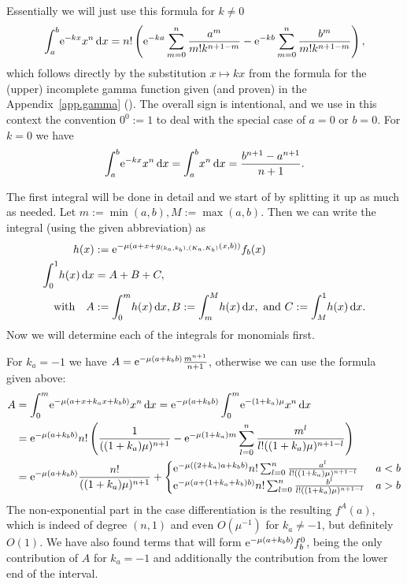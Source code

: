 \begin{Lemma}
  \begin{Proof}
    Essentially we will just use this formula for $k \neq 0$
    \begin{align}
      \Integ[b]{a}{x}{\Eto{-kx}x^n}
        = n!\left(\Eto{-ka}\sum_{m=0}^n \frac{a^m}{m!k^{n+1-m}} -
                  \Eto{-kb}\sum_{m=0}^n \frac{b^m}{m!k^{n+1-m}}\right),
    \end{align}
    which follows directly by the substitution $x \mapsto kx$ from the formula
    for the (upper) incomplete gamma function given (and proven) in the
    Appendix~\ref{app.gamma} ().
    The overall sign is intentional, and we use in this context the convention
    $0^0 := 1$ to deal with the special case of $a = 0$ or $b = 0$. For $k = 0$
    we have
    \begin{align}
      \Integ[b]{a}{x}{\Eto{-kx}x^n} = \Integ[b]{a}{x}{x^n} = \frac{b^{n+1} -
      a^{n+1}}{n+1}.
    \end{align}

    The first integral will be done in detail and we start of by splitting it up
    as much as needed. Let $m := \min(a,b), M := \max(a,b)$. Then we can write
    the integral (using the given abbreviation) as
    \begin{align*}
      h(x) &:= \Eto{-\mu(a+x+g_{(k_a,k_b),(K_a,K_b)}(x, b))}f_b(x) \\
      \Int{x}{h(x)} &= A + B + C, \\ \text{with} \quad
      A &:= \Integ[m]{0}{x}{h(x)},
      B := \Integ[M]{m}{x}{h(x)},\text{ and }
      C := \Integ[1]{M}{x}{h(x)}.
    \end{align*}
    Now we will determine each of the integrals for monomials first.
    
    For $k_a = -1$ we have $A = \Eto{-\mu (a+k_b b)} \frac{m^{n+1}}{n+1}$,
    otherwise we can use the formula given above:
    \begin{align*}
      A &= \Integ[m]{0}{x}{\Eto{-\mu(a+x+k_a x+k_b b)}x^n}
         = \Eto{-\mu(a+k_b b)} \Integ[m]{0}{x}{\Eto{-(1+k_a)\mu}x^n} \\
        &= \Eto{-\mu(a+k_b b)} n! \left(
         \frac{1}{((1+k_a)\mu)^{n+1}}
         - \Eto{-\mu(1+k_a)m}\sum_{l=0}^n \frac{m^l}{l! ((1+k_a)\mu)^{n+1-l}}
        \right) \\
      &= \Eto{-\mu(a+k_b b)} \frac{n!}{((1+k_a)\mu)^{n+1}} +
        \begin{cases}
        \Eto{-\mu((2+k_a) a+k_b b)} n! \sum_{l=0}^n
        \frac{a^l}{l!((1+k_a)\mu)^{n+1-l}}
          & a < b \\
          \Eto{-\mu(a + (1+k_a+k_b)b)} n! \sum_{l=0}^n
          \frac{b^l}{l!((1+k_a)\mu)^{n+1-l}}
          & a > b
      \end{cases}
    \end{align*}
    The non-exponential part in the case differentiation is the resulting
    $f^A(a)$, which is indeed of degree $(n,1)$ and even $O(\mu^{-1})$ for
    $k_a\neq -1$, but definitely $O(1)$. We have also found terms that will form
    $\Eto{-\mu(a+k_b b)} f^0_b$, being the only contribution of $A$ for $k_a
    = -1$ and additionally the contribution from the lower end of the interval.


\end{Proof}
\end{Lemma}
